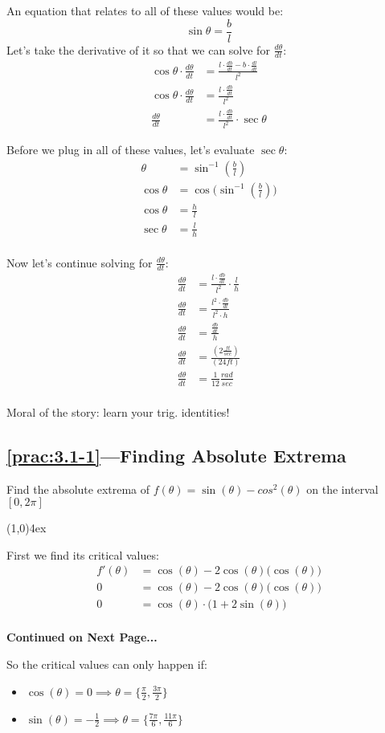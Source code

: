 \documentclass{MathNotes}
\newcommand{\br}{
\begin{center}
\line(1,0){4ex}
\end{center}}
\newcommand{\continued}{
\mbox{}
\vfill
\textbf{Continued on Next Page...}\newpage
}
\begin{document}
An equation that relates to all of these values would be:
$$\sin\theta=\frac{b}{l}$$
Let's take the derivative of it so that we can solve for $\frac{d\theta}{dt}$:
\begin{align*}
    \cos\theta\cdot\frac{d\theta}{dt}&=\frac{l\cdot\frac{db}{dt}-b\cdot\frac{dl}{dt}}{l^2}\\
    \cos\theta\cdot\frac{d\theta}{dt}&=\frac{l\cdot\frac{db}{dt}}{l^2}\\
    \frac{d\theta}{dt}&=\frac{l\cdot\frac{db}{dt}}{l^2}\cdot\sec\theta
\end{align*}

Before we plug in all of these values, let's evaluate $\sec\theta$:
\begin{align*}
    \theta&=\sin^{-1}(\frac{b}{l})\\
    \cos\theta&=\cos\big(\sin^{-1}(\frac{b}{l})\big)\\
    \cos\theta&=\frac{h}{l}\\
    \sec\theta&=\frac{l}{h}\\
\end{align*}

Now let's continue solving for $\frac{d\theta}{dt}$:
\begin{align*}
    \frac{d\theta}{dt}&=\frac{l\cdot\frac{db}{dt}}{l^2}\cdot\frac{l}{h}\\
    \frac{d\theta}{dt}&=\frac{l^2\cdot\frac{db}{dt}}{l^2\cdot h}\\
    \frac{d\theta}{dt}&=\frac{\frac{db}{dt}}{h}\\
    \frac{d\theta}{dt}&=\frac{(2\frac{ft}{sec})}{(24ft)}\\
    \frac{d\theta}{dt}&=\frac{1}{12}\frac{rad}{sec}\\
\end{align*}

Moral of the story: learn your trig. identities!
\subsection*{\ref{prac:3.1-1}---Finding Absolute Extrema}\label{ans:3.1-1}
Find the absolute extrema of $f(\theta)=\sin(\theta)-cos^2(\theta)$ on
the interval $[0, 2\pi]$
\br
First we find its critical values:
\begin{align*}
    f'(\theta)&=\cos(\theta)-2\cos(\theta)\big(\cos(\theta)\big)\\
    0&=\cos(\theta)-2\cos(\theta)\big(\cos(\theta)\big)\\
    0&=\cos(\theta)\cdot\big(1+2\sin(\theta)\big)\\
\end{align*}
\continued
So the critical values can only happen if:
\begin{multicols}{2}
    \begin{itemize}
        \item $\cos(\theta)=0\implies\theta=\{\frac{\pi}{2}, \frac{3\pi}{2}\}$
        \item $\sin(\theta)=-\frac{1}{2}\implies\theta=\{\frac{7\pi}{6},
            \frac{11\pi}{6}\}$
    \end{itemize}
\end{multicols}
\end{document}
